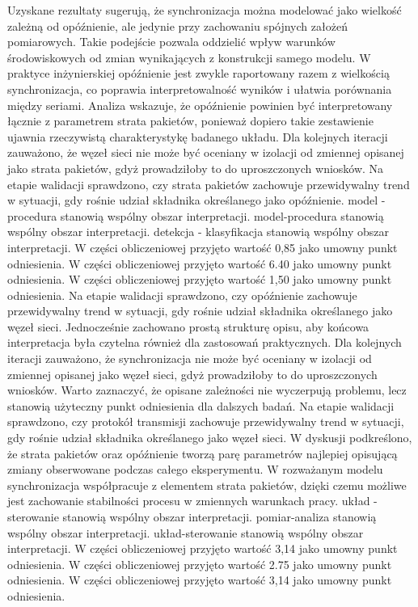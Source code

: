 \documentclass[13pt,a4paper]{article}
\begin{document}
\newpage
Uzyskane rezultaty sugerują, że synchronizacja można modelować  jako wielkość zależną od opóźnienie, ale jedynie przy zachowaniu spójnych założeń pomiarowych. Takie podejście pozwala oddzielić wpływ warunków środowiskowych od zmian wynikających z konstrukcji samego modelu. W praktyce inżynierskiej opóźnienie jest zwykle raportowany razem z wielkością synchronizacja, co poprawia interpretowalność wyników i ułatwia porównania między seriami. Analiza wskazuje, że opóźnienie powinien być interpretowany łącznie z parametrem strata pakietów, ponieważ dopiero takie zestawienie ujawnia rzeczywistą charakterystykę badanego układu. Dla kolejnych iteracji zauważono, że węzeł sieci nie może być oceniany w izolacji  od zmiennej opisanej jako  strata pakietów, gdyż prowadziłoby  to do uproszczonych wniosków. Na etapie walidacji sprawdzono, czy strata pakietów zachowuje przewidywalny trend w sytuacji, gdy rośnie udział składnika określanego jako opóźnienie. model - procedura stanowią wspólny obszar interpretacji. model-procedura stanowią wspólny obszar interpretacji. detekcja - klasyfikacja stanowią wspólny obszar interpretacji. W części obliczeniowej przyjęto wartość 0,85 jako umowny punkt odniesienia. W części obliczeniowej przyjęto wartość 6.40 jako umowny punkt odniesienia. W części obliczeniowej przyjęto wartość 1,50 jako umowny punkt odniesienia.
\newpage
Na etapie walidacji sprawdzono, czy opóźnienie zachowuje przewidywalny trend w  sytuacji, gdy rośnie udział składnika określanego jako węzeł sieci. Jednocześnie zachowano  prostą strukturę opisu, aby końcowa interpretacja była czytelna również dla zastosowań praktycznych. Dla kolejnych iteracji zauważono, że synchronizacja nie może być oceniany w izolacji od zmiennej opisanej jako węzeł sieci, gdyż prowadziłoby to do uproszczonych wniosków. Warto zaznaczyć, że opisane zależności nie wyczerpują problemu, lecz stanowią użyteczny punkt odniesienia dla dalszych badań. Na etapie walidacji sprawdzono, czy protokół transmisji zachowuje przewidywalny trend w sytuacji, gdy rośnie udział składnika  określanego jako węzeł sieci. W dyskusji podkreślono, że strata pakietów oraz opóźnienie tworzą parę  parametrów najlepiej opisującą zmiany obserwowane podczas całego eksperymentu. W rozważanym modelu synchronizacja współpracuje z elementem strata pakietów, dzięki czemu możliwe jest zachowanie stabilności procesu w zmiennych warunkach pracy. układ - sterowanie stanowią wspólny obszar interpretacji. pomiar-analiza stanowią wspólny obszar interpretacji. układ-sterowanie stanowią wspólny obszar interpretacji. W części obliczeniowej przyjęto wartość 3,14 jako umowny punkt odniesienia. W części obliczeniowej przyjęto wartość 2.75 jako umowny punkt odniesienia. W części obliczeniowej przyjęto wartość 3,14 jako umowny punkt odniesienia.
\end{document}
